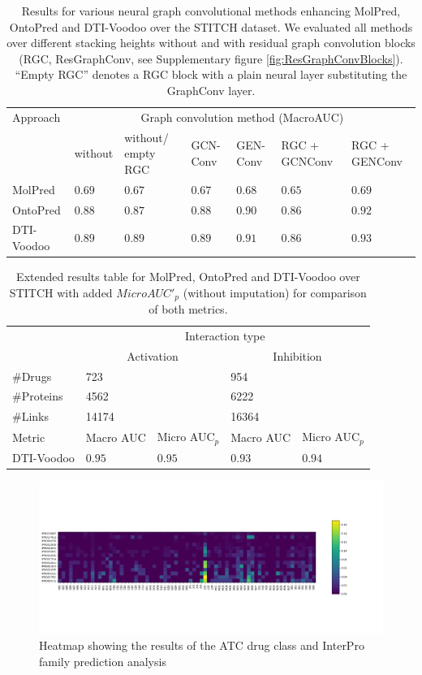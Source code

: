 \documentclass[]{article}
\newcommand{\name}{DTI-Voodoo}
\begin{document}
\clearpage
\begin{table}[ht]
	\centering

	\begin{tabular}{|p{2.0cm}|p{1.1cm}|p{1.2cm}|p{0.8cm}|p{0.8cm}|p{1.2cm}|p{1.2cm}|}
		\hline
		Approach&\multicolumn{6}{c|}{Graph convolution method (MacroAUC)}\\
		&without&without/ empty RGC&GCN-Conv&GEN-Conv&RGC + GCNConv&RGC + GENConv\\
		\hline
		MolPred & $0.69$ & $0.67$& $0.67$& $0.68$& $0.65$& $0.69$\\
		\hline
		OntoPred &$0.88$ &$0.87$ &$0.88$&$0.90$&$0.86$&$0.92$\\
		\hline
		\name& $0.89$&$0.89$& $0.89$& $0.91$& $0.86$& $\mathbf{0.93}$\\
		\hline
	\end{tabular}
	\caption{\label{tab:Results}Results for various neural graph
          convolutional methods enhancing MolPred, OntoPred and
          \name{} over the STITCH dataset. We evaluated all methods
          over different stacking heights without and with residual
          graph convolution blocks (RGC, ResGraphConv, see
          Supplementary figure \ref{fig:ResGraphConvBlocks}). ``Empty
          RGC'' denotes a RGC block with a plain neural layer
          substituting the GraphConv layer.}
\end{table}

\clearpage
\begin{table}[ht]
	\centering
	\begin{tabular}{|p{2.0cm}|p{1cm}|p{1cm}|p{1cm}|p{1cm}|}
		\hline
		&\multicolumn{4}{c|}{Interaction type}\\
		&\multicolumn{2}{c|}{Activation}&\multicolumn{2}{c|}{Inhibition}\\
		\#Drugs & \multicolumn{2}{l|}{723} & \multicolumn{2}{l|}{954}\\
		\#Proteins&\multicolumn{2}{l|}{4562}&\multicolumn{2}{l|}{6222}\\
		\#Links&\multicolumn{2}{l|}{14174}&\multicolumn{2}{l|}{16364}\\
		\hline
		Metric&Macro AUC&Micro AUC$_p$&Macro AUC&Micro AUC$_p$\\
		\name&$0.95$&$0.95$&$0.93$&$0.94$\\
		\hline
		
	\end{tabular}
	\caption{Extended results table for MolPred, OntoPred and
		\name{} over STITCH with added $MicroAUC'_p$ (without
		imputation) for comparison of both metrics.}
\end{table}

\clearpage
\begin{figure}[ht]%
	\centerline{\includegraphics[width=1.1\textwidth]{../figures/ATC_Interpro_heatmap.png}}
	\caption{Heatmap showing the results of the ATC drug class and InterPro family prediction analysis}
	\label{fig:ATCInterproHeatmap}
\end{figure}
\end{document}
